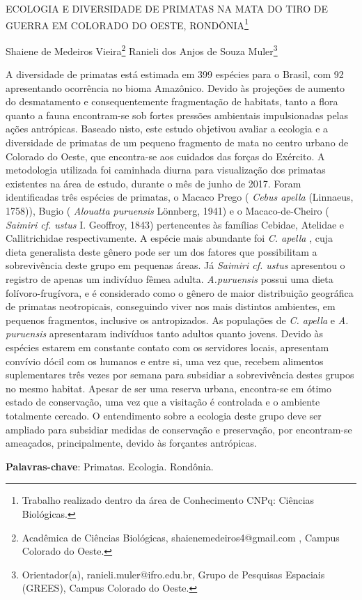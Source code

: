 \documentclass[article,12pt,onesidea,4paper,english,brazil]{abntex2}
\begin{document}
	
	
	\frenchspacing 
	
	\begin{center}
		\LARGE ECOLOGIA E DIVERSIDADE DE PRIMATAS NA MATA DO TIRO DE GUERRA
		EM COLORADO DO OESTE, RONDÔNIA\footnote{Trabalho realizado dentro da área de Conhecimento CNPq: Ciências Biológicas.}
		
		\normalsize
		Shaiene de Medeiros Vieira\footnote{Acadêmica de Ciências Biológicas, shaienemedeiros4@gmail.com , Campus Colorado do Oeste.} 
		Ranieli dos Anjos de Souza Muler\footnote{Orientador(a), ranieli.muler@ifro.edu.br, Grupo de Pesquisas Espaciais (GREES), Campus Colorado
			do Oeste.} 
		
	\end{center}
	
	\noindent A diversidade de primatas está estimada em 399 espécies para o Brasil, com 92
	apresentando ocorrência no bioma Amazônico. Devido às projeções de aumento do
	desmatamento e consequentemente fragmentação de habitats, tanto a flora quanto
	a fauna encontram-se sob fortes pressões ambientais impulsionadas pelas ações
	antrópicas. Baseado nisto, este estudo objetivou avaliar a ecologia e a diversidade
	de primatas de um pequeno fragmento de mata no centro urbano de Colorado do
	Oeste, que encontra-se aos cuidados das forças do Exército. A metodologia utilizada
	foi caminhada diurna para visualização dos primatas existentes na área de estudo,
	durante o mês de junho de 2017. Foram identificadas três espécies de primatas, o
	Macaco Prego ( \textit{Cebus apella} (Linnaeus, 1758)), Bugio ( \textit{Alouatta puruensis}
	Lönnberg, 1941) e o Macaco-de-Cheiro ( \textit{Saimiri cf. ustus} I. Geoffroy, 1843)
	pertencentes às famílias Cebidae, Atelidae e Callitrichidae respectivamente. A
	espécie mais abundante foi \textit{C. apella} , cuja dieta generalista deste gênero pode ser
	um dos fatores que possibilitam a sobrevivência deste grupo em pequenas áreas. Já
	\textit{Saimiri cf. ustus} apresentou o registro de apenas um indivíduo fêmea adulta. 
	\textit{A.puruensis} possui uma dieta folívoro-frugívora, e é considerado como o gênero de
	maior distribuição geográfica de primatas neotropicais, conseguindo viver nos mais
	distintos ambientes, em pequenos fragmentos, inclusive os antropizados. As
	populações de \textit{C. apella} e \textit{A. puruensis} apresentaram indivíduos tanto adultos
	quanto jovens. Devido às espécies estarem em constante contato com os servidores
	locais, apresentam convívio dócil com os humanos e entre si, uma vez que, recebem
	alimentos suplementares três vezes por semana para subsidiar a sobrevivência
	destes grupos no mesmo habitat. Apesar de ser uma reserva urbana, encontra-se
	em ótimo estado de conservação, uma vez que a visitação é controlada e o
	ambiente totalmente cercado. O entendimento sobre a ecologia deste grupo deve
	ser ampliado para subsidiar medidas de conservação e preservação, por
	encontram-se ameaçados, principalmente, devido às forçantes antrópicas.
	
	\vspace{\onelineskip}
	
	\noindent
	\textbf{Palavras-chave}: Primatas. Ecologia. Rondônia.
	
\end{document}
